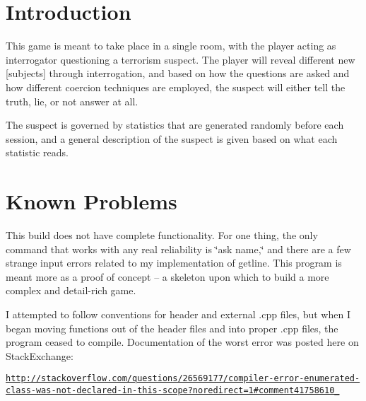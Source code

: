 \hypertarget{index_intro_sec}{}\section{Introduction}\label{index_intro_sec}
This game is meant to take place in a single room, with the player acting as interrogator questioning a terrorism suspect. The player will reveal different new \mbox{[}subjects\mbox{]} through interrogation, and based on how the questions are asked and how different coercion techniques are employed, the suspect will either tell the truth, lie, or not answer at all.

The suspect is governed by statistics that are generated randomly before each session, and a general description of the suspect is given based on what each statistic reads.\hypertarget{index_known_issues}{}\section{Known Problems}\label{index_known_issues}
This build does not have complete functionality. For one thing, the only command that works with any real reliability is \char`\"{}ask name,\char`\"{} and there are a few strange input errors related to my implementation of getline. This program is meant more as a proof of concept -- a skeleton upon which to build a more complex and detail-\/rich game.

I attempted to follow conventions for header and external .cpp files, but when I began moving functions out of the header files and into proper .cpp files, the program ceased to compile. Documentation of the worst error was posted here on Stack\+Exchange\+:

\href{http://stackoverflow.com/questions/26569177/compiler-error-enumerated-class-was-not-declared-in-this-scope?noredirect=1#comment41758610_26569177}{\tt http\+://stackoverflow.\+com/questions/26569177/compiler-\/error-\/enumerated-\/class-\/was-\/not-\/declared-\/in-\/this-\/scope?noredirect=1\#comment41758610\+\_}

